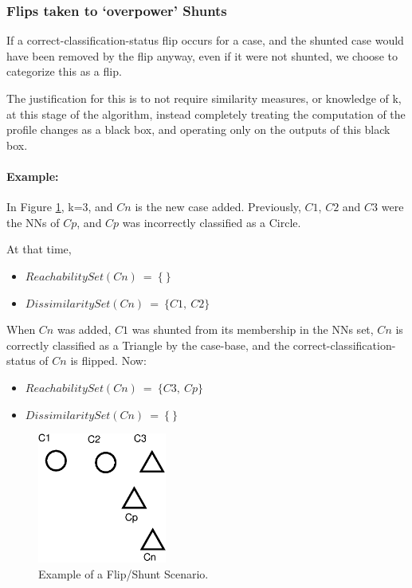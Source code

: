 \documentclass[a4paper,11pt]{report}
\begin{document}
\subsubsection{Flips taken to `overpower' Shunts}
If a correct-classification-status flip occurs for a case, and the shunted case would have been removed by the flip anyway, even if it were not shunted, we choose to categorize this as a flip. 

The justification for this is to not require similarity measures, or knowledge of k, at this stage of the algorithm, instead completely treating the computation of the profile changes as a black box, and operating only on the outputs of this black box.

\paragraph{Example:} In Figure \ref{fig:flipprecedence}, k=3, and $Cn$ is the new case added. Previously, $C1$, $C2$ and $C3$ were the NNs of $Cp$, and $Cp$ was incorrectly classified as a Circle. 

At that time,
\begin{itemize}
	\item $ReachabilitySet(Cn)~=~\{~\}$
	\item $DissimilaritySet(Cn)~=~\{C1,~C2\}$
\end{itemize}

\begin{samepage}
When $Cn$ was added, $C1$ was shunted from its membership in the NNs set, $Cn$ is correctly classified as a Triangle by the case-base, and the correct-classification-status of $Cn$ is flipped. Now:
\begin{itemize}
	\item $ReachabilitySet(Cn)~=~\{C3,~Cp\}$
	\item $DissimilaritySet(Cn)~=~\{~\}$
\end{itemize}
\end{samepage}

\begin{figure}[h!] \centering
\includegraphics[width=120pt]{./Drawn/FlipPrecedence}
\caption{Example of a Flip/Shunt Scenario.}
\label{fig:flipprecedence}
\end{figure}
\end{document}
